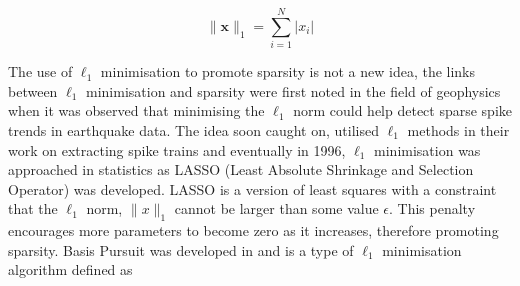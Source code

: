  


%
%


\begin{equation}
\label{eq:57}
  \|\boldsymbol{x}\|_1 = \sum_{i=1}^{N}|x_i|
\end{equation}

The use of $\ell_1$ minimisation to promote sparsity is not a new idea, the links between $\ell_1$ minimisation and sparsity were first noted in the field of geophysics when it was observed \cite{claerbout1973} that minimising the $\ell_1$ norm could help detect sparse spike trends in earthquake data. The idea soon caught on, \cite{taylor1979} utilised $\ell_1$ methods in their work on extracting spike trains and eventually in 1996, $\ell_1$ minimisation was approached in statistics as LASSO \cite{tibshirani1996} (Least Absolute Shrinkage and Selection Operator) was developed. LASSO is a version of least squares with a constraint that the $\ell_1$ norm, $\|x\|_1$ cannot be larger than some value $\epsilon$. This penalty encourages more parameters to become zero as it increases, therefore promoting sparsity. Basis Pursuit was developed in \cite{chen2001} and is a type of $\ell_1$ minimisation algorithm defined as 

